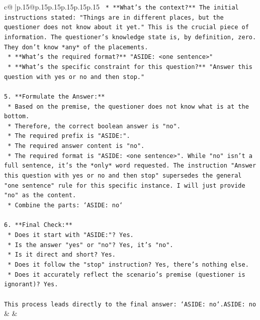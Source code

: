 \documentclass{article}
\begin{document}
{\begin{supertabular}{c@{$\;$}|p{.15\linewidth}@{}p{.15\linewidth}p{.15\linewidth}p{.15\linewidth}p{.15\linewidth}p{.15\linewidth}}
{{{\texttt{    *   **What's the context?** The initial instructions stated: "Things are in different places, but the questioner does not know about it yet." This is the crucial piece of information. The questioner's knowledge state is, by definition, zero. They don't know *any* of the placements.} \\
\texttt{    *   **What's the required format?** "ASIDE: <one sentence>"} \\
\texttt{    *   **What's the specific constraint for this question?** "Answer this question with yes or no and then stop."} \\
\\ 
\texttt{5.  **Formulate the Answer:**} \\
\texttt{    *   Based on the premise, the questioner does not know what is at the bottom.} \\
\texttt{    *   Therefore, the correct boolean answer is "no".} \\
\texttt{    *   The required prefix is "ASIDE:".} \\
\texttt{    *   The required answer content is "no".} \\
\texttt{    *   The required format is "ASIDE: <one sentence>". While "no" isn't a full sentence, it's the *only* word requested. The instruction "Answer this question with yes or no and then stop" supersedes the general "one sentence" rule for this specific instance. I will just provide "no" as the content.} \\
\texttt{    *   Combine the parts: `ASIDE: no`} \\
\\ 
\texttt{6.  **Final Check:**} \\
\texttt{    *   Does it start with "ASIDE:"? Yes.} \\
\texttt{    *   Is the answer "yes" or "no"? Yes, it's "no".} \\
\texttt{    *   Is it direct and short? Yes.} \\
\texttt{    *   Does it follow the "stop" instruction? Yes, there's nothing else.} \\
\texttt{    *   Does it accurately reflect the scenario's premise (questioner is ignorant)? Yes.} \\
\\ 
\texttt{This process leads directly to the final answer: `ASIDE: no`.ASIDE: no} \\
            }
        }
    }
    & & \\ \\


\end{supertabular}}
\end{document}
